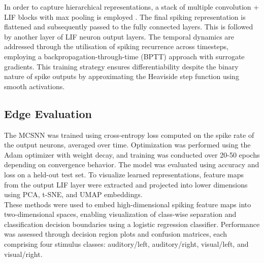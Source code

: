 \noindent In order to capture hierarchical representations, a stack of multiple convolution + LIF blocks with max pooling is employed \cite{shrestha2018slayer}. The final spiking representation is flattened and subsequently passed to the fully connected layers. This is followed by another layer of LIF neuron output layers. The temporal dynamics are addressed through the utilisation of spiking recurrence across timesteps, employing a backpropagation-through-time (BPTT) approach with surrogate gradients. This training strategy ensures differentiability despite the binary nature of spike outputs by approximating the Heaviside step function using smooth activations.\\

\subsection{Edge Evaluation}

The MCSNN was trained using cross-entropy loss computed on the spike rate of the output neurons, averaged over time. Optimization was performed using the Adam optimizer with weight decay, and training was conducted over 20-50 epochs depending on convergence behavior. The model was evaluated using accuracy and loss on a held-out test set. To visualize learned representations, feature maps from the output LIF layer were extracted and projected into lower dimensions using PCA, t-SNE, and UMAP embeddings.\\

\noindent These methods were used to embed high-dimensional spiking feature maps into two-dimensional spaces, enabling visualization of class-wise separation and classification decision boundaries using a logistic regression classifier. Performance was assessed through decision region plots and confusion matrices, each comprising four stimulus classes: auditory/left, auditory/right, visual/left, and visual/right.\\

